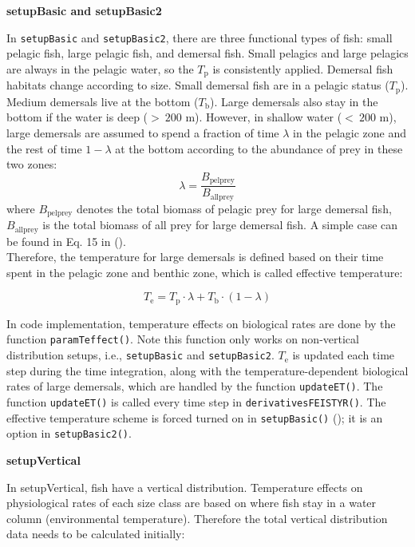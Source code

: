 \documentclass[
]{article}
\begin{document}
\textbf{setupBasic and setupBasic2}

In \texttt{setupBasic} and \texttt{setupBasic2}, there are three
functional types of fish: small pelagic fish, large pelagic fish, and
demersal fish. Small pelagics and large pelagics are always in the
pelagic water, so the \(T_{\mathrm{p}}\) is consistently applied.
Demersal fish habitats change according to size. Small demersal fish are
in a pelagic status (\(T_{\mathrm{p}}\)). Medium demersals live at the
bottom (\(T_{\mathrm{b}}\)). Large demersals also stay in the bottom if
the water is deep (\(>~200\) m). However, in shallow water (\(<~200\)
m), large demersals are assumed to spend a fraction of time \(\lambda\)
in the pelagic zone and the rest of time \(1-\lambda\) at the bottom
according to the abundance of prey in these two zones: \begin{equation}
\lambda = \frac{B_{\mathrm{pelprey}}}{B_{\mathrm{allprey}}}
\end{equation} where \(B_{\mathrm{pelprey}}\) denotes the total biomass
of pelagic prey for large demersal fish, \(B_{\mathrm{allprey}}\) is the
total biomass of all prey for large demersal fish. A simple case can be
found in Eq. 15 in ().\\
Therefore, the temperature for large demersals is defined based on their
time spent in the pelagic zone and benthic zone, which is called
effective temperature:

\begin{equation} 
T_{\mathrm{e}} = T_{\mathrm{p}} \cdot \lambda + T_{\mathrm{b}} \cdot (1 - \lambda)
\end{equation}

In code implementation, temperature effects on biological rates are done
by the function \texttt{paramTeffect()}. Note this function only works
on non-vertical distribution setups, i.e., \texttt{setupBasic} and
\texttt{setupBasic2}. \(T_{\mathrm{e}}\) is updated each time step
during the time integration, along with the temperature-dependent
biological rates of large demersals, which are handled by the function
\texttt{updateET()}. The function \texttt{updateET()} is called every
time step in \texttt{derivativesFEISTYR()}. The effective temperature
scheme is forced turned on in \texttt{setupBasic()}
(); it is an option
in \texttt{setupBasic2()}.

\textbf{setupVertical}

In setupVertical, fish have a vertical distribution. Temperature effects
on physiological rates of each size class are based on where fish stay
in a water column (environmental temperature). Therefore the total
vertical distribution data needs to be calculated initially:
\end{document}
